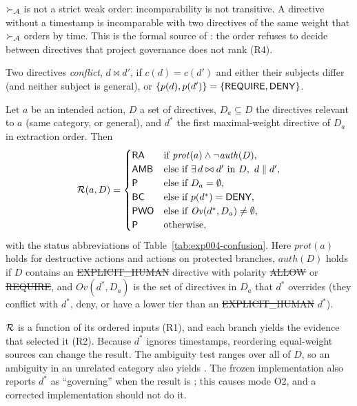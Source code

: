 $\succ_{\mathcal{A}}$ is not a strict weak order: incomparability is not transitive. A directive without a timestamp is incomparable with two directives of the same weight that $\succ_{\mathcal{A}}$ orders by time. This is the formal source of \sAMB{}: the order refuses to decide between directives that project governance does not rank (R4).

Two directives \emph{conflict}, $d \bowtie d'$, if $c(d) = c(d')$ and either their subjects differ (and neither subject is general), or $\{p(d), p(d')\} = \{\textsf{REQUIRE}, \textsf{DENY}\}$.

\begin{definition}
\label{def:res}
Let $a$ be an intended action, $D$ a set of directives, $D_a \subseteq D$ the directives relevant to $a$ (same category, or general), and $d^{*}$ the first maximal-weight directive of $D_a$ in extraction order. Then
\[
\mathcal{R}(a, D) =
\begin{cases}
\textsf{RA} & \text{if } \mathit{prot}(a) \land \lnot \mathit{auth}(D),\\
\textsf{AMB} & \text{else if } \exists\, d \bowtie d' \text{ in } D,\ d \parallel d',\\
\textsf{P} & \text{else if } D_a = \emptyset,\\
\textsf{BC} & \text{else if } p(d^{*}) = \textsf{DENY},\\
\textsf{PWO} & \text{else if } \mathit{Ov}(d^{*}, D_a) \neq \emptyset,\\
\textsf{P} & \text{otherwise,}
\end{cases}
\]
with the status abbreviations of Table~\ref{tab:exp004-confusion}.
Here $\mathit{prot}(a)$ holds for destructive actions and actions on protected branches, $\mathit{auth}(D)$ holds if $D$ contains an \st{EXPLICIT\_HUMAN} directive with polarity \st{ALLOW} or \st{REQUIRE}, and $\mathit{Ov}(d^{*}, D_a)$ is the set of directives in $D_a$ that $d^{*}$ overrides (they conflict with $d^{*}$, deny, or have a lower tier than an \st{EXPLICIT\_HUMAN} $d^{*}$).
\end{definition}

$\mathcal{R}$ is a function of its ordered inputs (R1), and each branch yields the evidence that selected it (R2). Because $d^{*}$ ignores timestamps, reordering equal-weight sources can change the result. The ambiguity test ranges over all of $D$, so an ambiguity in an unrelated category also yields \sAMB{}. The frozen implementation also reports $d^{*}$ as ``governing'' when the result is \sAMB{}; this causes mode O2, and a corrected implementation should not do it.

